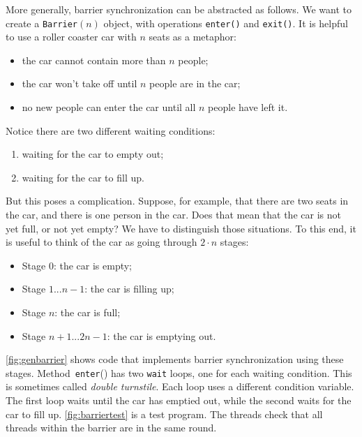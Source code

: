 \documentclass{report}
\begin{document}
More generally, barrier synchronization can be abstracted as follows.
We want to create a \texttt{Barrier}$(n)$ object, with operations
\texttt{enter()} and \texttt{exit()}.  It is helpful to use
a roller coaster car with $n$ seats as a metaphor:
\begin{itemize}
\item the car cannot contain more than $n$ people;
\item the car won't take off until $n$ people are in the car;
\item no new people can enter the car until all $n$ people have left it.
\end{itemize}
Notice there are two different waiting conditions:
\begin{enumerate}
\item waiting for the car to empty out;
\item waiting for the car to fill up.
\end{enumerate}

But this poses a complication.  Suppose, for example, that there are two
seats in the car, and there is one person in the car.  Does that mean that
the car is not yet full, or not yet empty?  We have to distinguish
those situations.  To this end, it is useful to think of the car as going through
$2 \cdot n$ stages:
\begin{itemize}
\item[] Stage 0: the car is empty;
\item[] Stage $1 ... n-1$: the car is filling up;
\item[] Stage $n$: the car is full;
\item[] Stage $n+1 ... 2n - 1$: the car is emptying out.
\end{itemize}

\autoref{fig:genbarrier} shows code that implements barrier synchronization
using these stages.
Method~\texttt{enter}() has two \texttt{wait} loops, one for each
waiting condition.
This is sometimes called \emph{double turnstile}.
Each loop uses a different condition variable.
The first loop waits until the car has emptied out, while
the second waits for the car to fill up.
\autoref{fig:barriertest} is a test program.  The threads check
that all threads within the barrier are in the same round.
\end{document}
